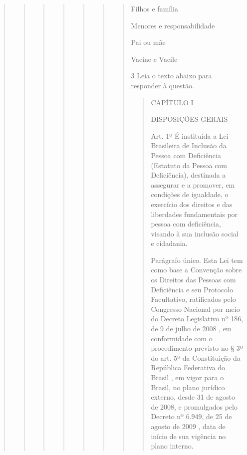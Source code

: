 \begin{quote}
\begin{quote}
\begin{quote}
\begin{quote}
\begin{quote}
\begin{quote}
{\begin{quote}
\begin{escolha}

\item
  Filhos e família
\item
  Menores e responsabilidade
\item
  Pai ou mãe
\item
  Vacine e Vacile
\end{escolha}


\num{3} Leia o texto abaixo para responder à questão. 

\begin{quote}

CAPÍTULO I

DISPOSIÇÕES GERAIS

Art. 1º É instituída a Lei Brasileira de Inclusão da Pessoa com
Deficiência (Estatuto da Pessoa com Deficiência), destinada a assegurar
e a promover, em condições de igualdade, o exercício dos direitos e das
liberdades fundamentais por pessoa com deficiência, visando à sua
inclusão social e cidadania.

Parágrafo único. Esta Lei tem como base a Convenção sobre os Direitos
das Pessoas com Deficiência e seu Protocolo Facultativo, ratificados
pelo Congresso Nacional por meio do Decreto Legislativo nº 186, de 9 de
julho de 2008 , em conformidade com o procedimento previsto no § 3º do
art. 5º da Constituição da República Federativa do Brasil , em vigor
para o Brasil, no plano jurídico externo, desde 31 de agosto de 2008, e
promulgados pelo Decreto nº 6.949, de 25 de agosto de 2009 , data de
início de sua vigência no plano interno.



\end{quote}
\end{quote}}
\end{quote}
\end{quote}
\end{quote}
\end{quote}
\end{quote}
\end{quote}
